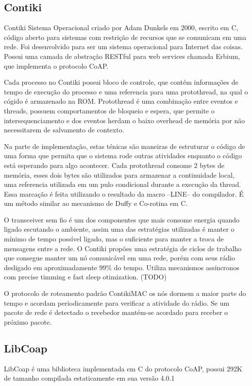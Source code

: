 \subsection{Contiki}
Contiki Sistema Operacional criado por Adam Dunkels em 2000, escrito em C, c\'odigo aberto para sistemas com restri\c{c}\~ao de recursos que se comunicam em uma rede. Foi desenvolvido para ser um sistema operacional para Internet das coisas. Possui uma camada de abstra\c{c}\~ao RESTful para web services chamada Erbium, que implementa o protocolo CoAP.

Cada processo no Contiki possui bloco de controle, que contém informa\c{c}\~oes de tempo de execu\c{c}\~ao do processo e uma referencia para uma protothread, na qual o c\'ogido \'e armazenado na ROM. Protothread é uma combina\c{c}\~ao entre eventos e threads, possuem comportamentos de bloqueio e espera, que permite o intersequenciamento e dos eventos herdam o baixo overhead de mem\'oria por n\~ao necessitarem de salvamento de contexto.

Na parte de implementação, estas ténicas são maneiras de estruturar o c\'odigo de uma forma que permita que o sistema rode outras atividades enquanto o c\'odigo est\'a esperando para algo acontecer. Cada protothread consome 2 bytes de mem\'oria, esses dois bytes s\~ao utilizados para armazenar a continuidade local, uma referencia utilizada em um pulo condicional durante a execu\c{c}\~ao da thread. Essa marca\c{c}\~ao \'e feita utilizando o resultado da macro --LINE-- do compilador. \'E um método similar ao mecanismo de Duffy e Co-rotina em C. \cite{duffy}

O transceiver sem fio \'e um dos componentes que mais consome energia quando ligado escutando o ambiente, assim uma das estratégias utilizadas é manter o m\'inimo de tempo poss\'ivel ligado, mas o suficiente para manter a troca de mensagens entre a rede. O Contiki prop\~oes uma estrat\'egia de ciclos de trabalho que consegue manter um n\'o comunic\'avel em uma rede, por\'em com seus r\'adio desligado em aproximadamente 99\% do tempo. Utiliza mecanismos ass\'incronos com precise timming e fast sleep otimization. (TODO)

O protocolo de roteamento padr\~ao ContikiMAC os n\'os dormem a maior parte do tempo e acordam periodicamente para verificar a atividade do r\'adio. Se um pacote de rede \'e detectado o recebedor mant\'em-se acordado para receber o pr\'oximo pacote.

\subsection{LibCoap}
LibCoap \'e uma biblioteca implementada em C do protocolo CoAP, possui 292K de tamanho compilada estaticamente em sua vers\~ao 4.0.1


